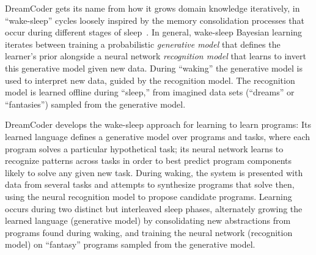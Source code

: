 \documentclass[12pt]{article}
\begin{document}
DreamCoder gets its name from how it grows domain knowledge iteratively, in ``wake-sleep'' cycles loosely inspired by the memory consolidation processes that occur during different stages of sleep~\cite{DUDAI201520,fosse2003dreaming}. In general, wake-sleep Bayesian learning 	
~\cite{hinton1995wake} iterates between training a probabilistic \emph{generative model} that defines the learner's prior alongside a neural network \emph{recognition model} that learns to invert this generative model given new data. During ``waking'' the generative model is used to interpret new data, guided by the recognition model.  The recognition model is learned offline during ``sleep,'' from imagined data sets (``dreams'' or ``fantasies'') sampled %
from the generative model. 

DreamCoder develops the wake-sleep approach for learning to learn programs: %
Its learned language defines a generative model over programs and tasks, where each program solves a particular hypothetical task; its neural network learns to recognize patterns across tasks in order to best predict program components likely to solve any given new task.  
During waking, the system
is presented with data from several %
tasks and attempts to synthesize programs that solve then, using the neural recognition model to propose candidate programs.   %
%
Learning occurs during two distinct but interleaved sleep phases,
alternately growing the learned language (generative model) by consolidating %
new abstractions 
from programs found %
during waking, and training the neural network (recognition model) on %
``fantasy'' programs sampled from the generative model.
\end{document}
